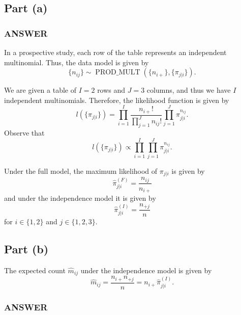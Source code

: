 \documentclass[
]{article}
\begin{document}
\hypertarget{part-a-2}{%
\subsection{Part (a)}\label{part-a-2}}


\hypertarget{answer-13}{%
\subsubsection{ANSWER}\label{answer-13}}

In a prospective study, each row of the table represents an independent
multinomial. Thus, the data model is given by \[
\{n_{i j}\} \sim \operatorname{PROD\_MULT}(\{n_{i+}\},\{\pi_{j|i}\}).
\]

We are given a table of \(I=2\) rows and \(J=3\) columns, and thus we
have \(I\) independent multinomials. Therefore, the likelihood function
is given by \[
  l(\{\pi_{j|i}\}) = \prod_{i=1}^{I} \frac{n_{i+}!}{\prod_{j=1}^{J} n_{i j}!}
    \prod_{j=1}^{J} \pi_{j|i}^{n_{i j}}.
\] Observe that \[
  l(\{\pi_{j|i}\}) \propto \prod_{i=1}^{I} \prod_{j=1}^{J} \pi_{j|i}^{n_{i j}}.
\]

Under the full model, the maximum likelihood of \(\pi_{j|i}\) is given
by \[
  \hat{\pi}_{j | i}^{(F)} = \frac{n_{i j}}{n_{i+}}
\] and under the independence model it is given by \[
  \hat{\pi}_{j | i}^{(I)} = \frac{n_{+j}}{n}
\] for \(i \in \{1,2\}\) and \(j \in \{1,2,3\}\).

\hypertarget{part-b-2}{%
\subsection{Part (b)}\label{part-b-2}}


The expected count \(\hat{m}_{i j}\) under the independence model is
given by \[
  \hat{m}_{i j} = \frac{n_{i+}n_{+j}}{n} = n_{i+} \hat{\pi}_{j|i}^{(I)}.
\]

\hypertarget{answer-14}{%
\subsubsection{ANSWER}\label{answer-14}}
\end{document}
